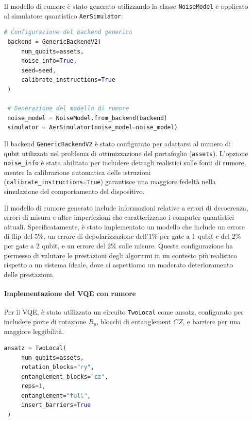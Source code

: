 Il modello di rumore è stato generato utilizzando la classe \texttt{NoiseModel} 
e applicato al simulatore quantistico \texttt{AerSimulator}:

\begin{lstlisting}[language=python, caption={Configurazione del modello di rumore per la simulazione.}]
 # Configurazione del backend generico
 backend = GenericBackendV2(
     num_qubits=assets, 
     noise_info=True,
     seed=seed,
     calibrate_instructions=True
 )

 # Generazione del modello di rumore
 noise_model = NoiseModel.from_backend(backend)
 simulator = AerSimulator(noise_model=noise_model)
\end{lstlisting}

Il backend \texttt{GenericBackendV2} è stato configurato per adattarsi al numero 
di qubit utilizzati nel problema di ottimizzazione del portafoglio (\texttt{assets}). 
L'opzione \texttt{noise\_info} è stata abilitata per includere dettagli realistici 
sulle fonti di rumore, mentre la calibrazione automatica delle istruzioni 
(\texttt{calibrate\_instructions=True}) garantisce una maggiore fedeltà nella 
simulazione del comportamento del dispositivo.

Il modello di rumore generato include informazioni relative a errori di decoerenza, 
errori di misura e altre imperfezioni che caratterizzano i computer quantistici 
attuali. Specificatamente, è stato implementato un modello che include un errore 
di flip del 5\%, un errore di depolarizzazione dell'1\% per gate a 1 qubit e del 2\%
per gate a 2 qubit, e un errore del 2\% sulle misure. Questa configurazione ha 
permesso di valutare le prestazioni degli algoritmi in un contesto più realistico 
rispetto a un sistema ideale, dove ci aspettiamo un moderato deterioramento delle 
prestazioni.



\paragraph{Implementazione del VQE con rumore} 

Per il VQE, è stato utilizzato un circuito \texttt{TwoLocal} come ansatz, configurato 
per includere porte di rotazione $R_y$, blocchi di entanglement $CZ$, e barriere per 
una maggiore leggibilità.

\begin{lstlisting}[language=python, caption={Configurazione dell'ansatz per il VQE.}]
 ansatz = TwoLocal(
     num_qubits=assets,
     rotation_blocks="ry",
     entanglement_blocks="cz",
     reps=1,
     entanglement="full",
     insert_barriers=True
 )
\end{lstlisting}

